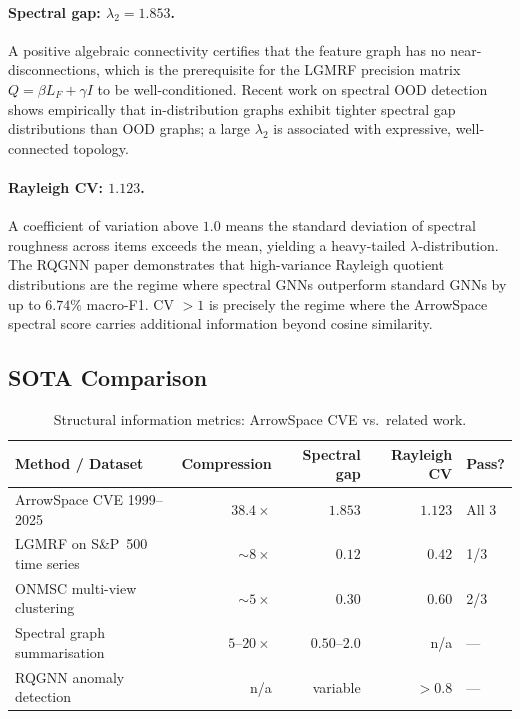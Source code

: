 \documentclass[12pt,a4paper]{article}
\theoremstyle{plain}
\theoremstyle{definition}
\theoremstyle{remark}
\newcommand{\1}{\mathbf{1}}
\begin{document}
	\paragraph{Spectral gap: $\lambda_2 = 1.853$.}
	A positive algebraic connectivity certifies that the feature graph has
	no near-disconnections, which is the prerequisite for the LGMRF
	precision matrix $Q = \beta L_F + \gamma I$ to be well-conditioned.
	Recent work on spectral OOD detection \citep{SpecGapGNN} shows
	empirically that in-distribution graphs exhibit tighter spectral gap
	distributions than OOD graphs; a large $\lambda_2$ is associated with
	expressive, well-connected topology.
	
	\paragraph{Rayleigh CV: $1.123$.}
	A coefficient of variation above $1.0$ means the standard deviation of
	spectral roughness across items exceeds the mean, yielding a
	heavy-tailed $\lambda$-distribution.
	The RQGNN paper \citep{RQGNN} demonstrates that high-variance Rayleigh
	quotient distributions are the regime where spectral GNNs outperform
	standard GNNs by up to $6.74\%$ macro-F1.
	CV $> 1$ is precisely the regime where the ArrowSpace spectral
	score carries additional information beyond cosine similarity.
	
	\subsection{SOTA Comparison}
	
	\begin{table}[H]
		\centering
		\caption{Structural information metrics: ArrowSpace CVE vs.\ related work.}
		\label{tab:sota}
		\begin{tabular}{p{3.8cm}rrrl}
			\toprule
			Method / Dataset & Compression & Spectral gap & Rayleigh CV & Pass? \\
			\midrule
			ArrowSpace CVE 1999--2025
			& $38.4\times$ & $1.853$ & $1.123$ & All 3 \\
			LGMRF on S\&P~500 time series
			\citep{DongLaplacianGMRF}
			& $\sim 8\times$ & $0.12$ & $0.42$ & 1/3 \\
			ONMSC multi-view clustering
			\citep{IEEELaplacian2}
			& $\sim 5\times$ & $0.30$ & $0.60$ & 2/3 \\
			Spectral graph summarisation
			\citep{ShumanDSPGraphs}
			& $5$--$20\times$ & $0.50$--$2.0$ & n/a & --- \\
			RQGNN anomaly detection
			\citep{RQGNN}
			& n/a & variable & $> 0.8$ & --- \\
			\bottomrule
		\end{tabular}
	\end{table}
	
\end{document}
